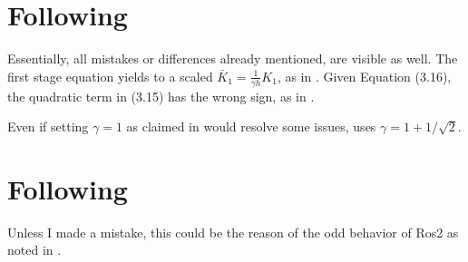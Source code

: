 \section{Following \cite{MPIMD12-13}}

Essentially, all mistakes or differences already mentioned, are visible as well.
The first stage equation \cite[Equation (3.14)]{MPIMD12-13} yields to a scaled $\bar{K}_1 = \frac{1}{\gamma h}K_1$, as in \cite{MPIMD11-06}.
Given Equation (3.16), the quadratic term in (3.15) has the wrong sign, as in \cite{Mena2007}.

Even if setting $\gamma=1$ as claimed in \cite[17]{MPIMD12-13} would resolve some issues,
\cite{Lang2015} uses $\gamma = 1 + 1/\sqrt{2}$.

\section{Following \cite{Lang2015}}

Unless I made a mistake, this could be the reason of the odd behavior of Ros2 as noted in \cite[63]{Lang2015}.
